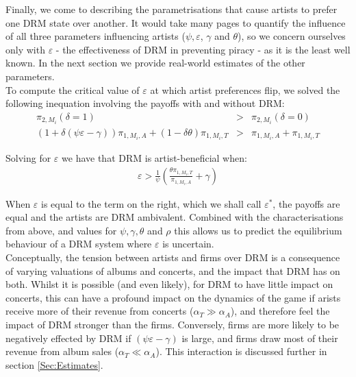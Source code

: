 \documentclass[a4paper,12pt]{article}
\numberwithin{equation}{section}
\newcommand{\artistpayoff}[2]{\pi_{#1, M_{#2}}}
\newcommand{\artistalbum}[2]{\pi_{#1, M_{#2}, A}}
\newcommand{\artistticket}[2]{\pi_{#1, M_{#2}, T}}
\newcommand{\drminf}{(\psi \varepsilon - \gamma)}
\begin{document}
Finally, we come to describing the parametrisations that cause artists to prefer one DRM state over another. It would take many pages to quantify the influence of all three parameters influencing artists ($\psi, \varepsilon$, $\gamma$ and $\theta$), so we concern ourselves only with $\varepsilon$ - the effectiveness of DRM in preventing piracy - as it is the least well known. In the next section we provide real-world estimates of the other parameters.\\

To compute the critical value of $\varepsilon$ at which artist preferences flip, we solved the following inequation involving the payoffs with and without DRM:
\begin{eqnarray*}
\artistpayoff{2}{i}(\delta = 1) & > & \artistpayoff{2}{i}(\delta = 0)\\
(1 + \delta \drminf) \artistalbum{1}{i} + (1 - \delta \theta) \artistticket{1}{i} & > & \artistalbum{1}{i} + \artistticket{1}{i}
\end{eqnarray*}

Solving for $\varepsilon$ we have that DRM is artist-beneficial when:
\begin{eqnarray}
\varepsilon > \frac{1}{\psi} \left( \frac{\theta \artistticket{1}{i}}{\artistalbum{1}{i}} + \gamma \right)
\label{Eq:EpsilonStar}
\end{eqnarray}

When $\varepsilon$ is equal to the term on the right, which we shall call $\varepsilon^*$, the payoffs are equal and the artists are DRM ambivalent. Combined with the characterisations from above, and values for $\psi, \gamma, \theta$ and $\rho$ this allows us to predict the equilibrium behaviour of a DRM system where $\varepsilon$ is uncertain.\\

Conceptually, the tension between artists and firms over DRM is a consequence of varying valuations of albums and concerts, and the impact that DRM has on both. Whilst it is possible (and even likely), for DRM to have little impact on concerts, this can have a profound impact on the dynamics of the game if arists receive more of their revenue from concerts ($\alpha_T \gg \alpha_A$), and therefore feel the impact of DRM stronger than the firms. Conversely, firms are more likely to be negatively effected by DRM if $\drminf$ is large, and firms draw most of their revenue from album sales ($\alpha_T \ll \alpha_A$). This interaction is discussed further in section \ref{Sec:Estimates}.
\end{document}
